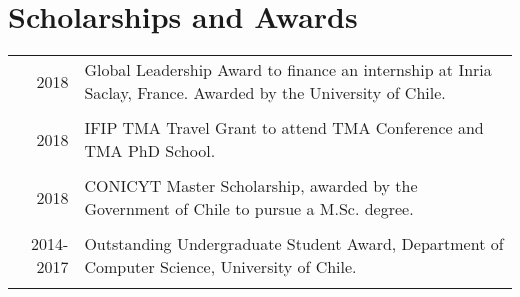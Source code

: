 \documentclass[a4paper,10pt]{article}
\begin{document}
\section{Scholarships and Awards}
\begin{tabular}{rp{13.5cm}}
2018 & Global Leadership Award to finance an internship at Inria Saclay, France. Awarded by the University of Chile. \\&\\
2018 & IFIP TMA Travel Grant to attend TMA Conference and TMA PhD School. \\&\\
2018 & CONICYT Master Scholarship, awarded by the Government of Chile to pursue a M.Sc. degree. \\&\\
2014-2017 & Outstanding Undergraduate Student Award, Department of Computer Science, University of Chile. \\&\\
\end{tabular}

\end{document}
